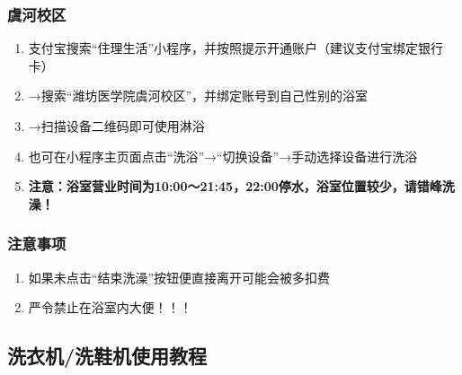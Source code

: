 \subsubsection[虞河校区]{虞河校区}
\label{shower_software_y}
\begin{enumerate}
    \item 支付宝搜索“住理生活”小程序，并按照提示开通账户（建议支付宝绑定银行卡）
    \item →搜索“潍坊医学院虞河校区”，并绑定账号到自己性别的浴室
    \item →扫描设备二维码即可使用淋浴
    \item 也可在小程序主页面点击“洗浴”→“切换设备”→手动选择设备进行洗浴
    \item \textbf{注意：浴室营业时间为10:00～21:45，22:00停水，浴室位置较少，请错峰洗澡！}
\end{enumerate}
\subsubsection*{注意事项}
\begin{enumerate}
    \item 如果未点击“结束洗澡”按钮便直接离开可能会被多扣费
    \item 严令禁止在浴室内大便！！！
\end{enumerate}

\subsection[洗衣机/洗鞋机使用教程]{洗衣机/洗鞋机使用教程}
